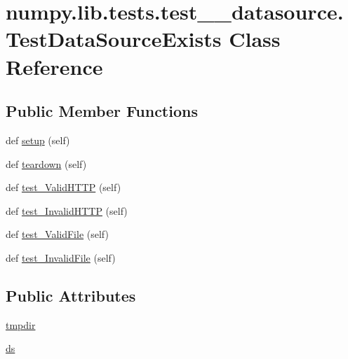 \hypertarget{classnumpy_1_1lib_1_1tests_1_1test____datasource_1_1TestDataSourceExists}{}\section{numpy.\+lib.\+tests.\+test\+\_\+\+\_\+datasource.\+Test\+Data\+Source\+Exists Class Reference}
\label{classnumpy_1_1lib_1_1tests_1_1test____datasource_1_1TestDataSourceExists}
\subsection*{Public Member Functions}
\begin{DoxyCompactItemize}
\item 
def \hyperlink{classnumpy_1_1lib_1_1tests_1_1test____datasource_1_1TestDataSourceExists_aa25e902ef83ad16ee0122c9606b9ceab}{setup} (self)
\item 
def \hyperlink{classnumpy_1_1lib_1_1tests_1_1test____datasource_1_1TestDataSourceExists_a39c3b5c306a2cbee55ea39e0462a2b1d}{teardown} (self)
\item 
def \hyperlink{classnumpy_1_1lib_1_1tests_1_1test____datasource_1_1TestDataSourceExists_a9ccf8567b718c8d18f7cb59ab585276d}{test\+\_\+\+Valid\+H\+T\+TP} (self)
\item 
def \hyperlink{classnumpy_1_1lib_1_1tests_1_1test____datasource_1_1TestDataSourceExists_ad4977d5b9e8492d0024487aef98e6fbc}{test\+\_\+\+Invalid\+H\+T\+TP} (self)
\item 
def \hyperlink{classnumpy_1_1lib_1_1tests_1_1test____datasource_1_1TestDataSourceExists_aaf480bfb89ccc35e0a81921c8dee5a21}{test\+\_\+\+Valid\+File} (self)
\item 
def \hyperlink{classnumpy_1_1lib_1_1tests_1_1test____datasource_1_1TestDataSourceExists_abcf6306dee7902691b9c55feaecd67ce}{test\+\_\+\+Invalid\+File} (self)
\end{DoxyCompactItemize}
\subsection*{Public Attributes}
\begin{DoxyCompactItemize}
\item 
\hyperlink{classnumpy_1_1lib_1_1tests_1_1test____datasource_1_1TestDataSourceExists_accd454200ac09443a174fe7e42bde9c9}{tmpdir}
\item 
\hyperlink{classnumpy_1_1lib_1_1tests_1_1test____datasource_1_1TestDataSourceExists_aed1428a2aacab8c5aea5ab8af59cfba7}{ds}
\end{DoxyCompactItemize}


